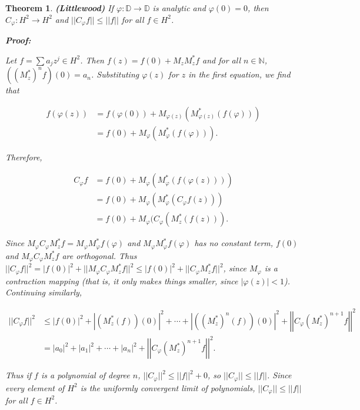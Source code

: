 \documentclass{article}
\theoremstyle{colontheorem}
\newtheorem{theorem}{Theorem}[section]
\newenvironment{Theorem}
{
	\begin{mdframed}[backgroundcolor=TheoremOrange!10]
	\begin{theorem}
}
{
	\end{theorem}
	\end{mdframed}
	
	\vspace{.15in}
}
\newenvironment{Proof}
{
	\begin{mdframed}[backgroundcolor=ProofPurple!10]
	\textbf{Proof:}%
}
{
	\end{mdframed}
	
	\vspace{.085in}
}
\begin{document}
\begin{Theorem}
	
	\textbf{(Littlewood)} If $\varphi : \mathbb{D} \longrightarrow \mathbb{D}$ is analytic and $\varphi(0) = 0$, then $C_\varphi : H^2 \longrightarrow H^2$ and $||C_\varphi f|| \leq ||f||$ for all $f \in H^2$.
	
	\begin{Proof}
		Let $f = \displaystyle\sum a_j z^j \in H^2$. Then $f(z) = f(0) + M_z M_z^* f$ and for all $n \in \mathbb{N}$, $\left( (M_z^*)^n f \right)(0) = a_n$. Substituting $\varphi(z)$ for $z$ in the first equation, we find that 
		
		\begin{align*}
			f(\varphi(z)) &= f(\varphi(0)) + M_{\varphi(z)} \left( M_{\varphi(z)}^* (f(\varphi)) \right)\\
			&= f(0) + M_\varphi \left( M_\varphi^* (f(\varphi)) \right).
		\end{align*}
		
		Therefore,
		
		\begin{align*}
			C_\varphi f &= f(0) + M_\varphi (M_\varphi^* (f(\varphi(z))))\\
			&= f(0) + M_\varphi (M_\varphi^* (C_\varphi f(z)))\\
			&= f(0) + M_\varphi (C_\varphi(M_z^* (f(z))).
		\end{align*}
		
		Since $M_\varphi C_\varphi M_z^* f = M_\varphi M_\varphi^* f(\varphi)$ and $M_\varphi M_\varphi^* f(\varphi)$ has no constant term, $f(0)$ and $M_\varphi C_\varphi M_z^* f$ are orthogonal. Thus $||C_\varphi f||^2 = |f(0)|^2 + ||M_\varphi C_\varphi M_z^* f||^2 \leq |f(0)|^2 + ||C_\varphi M_z^* f||^2$, since $M_\varphi$ is a contraction mapping (that is, it only makes things smaller, since $|\varphi(z)| < 1$). Continuing similarly,
		
		\begin{align*}
			||C_\varphi f||^2 &\leq |f(0)|^2 + |(M_z^* (f)) (0)|^2 + \cdots + \left| \left( (M_z^*)^n (f) \right) (0) \right|^2 + \left| \left| C_\varphi (M_z^*)^{n + 1} f \right| \right|^2\\
			&= |a_0|^2 + |a_1|^2 + \cdots + |a_n|^2 + \left| \left| C_\varphi (M_z^*)^{n + 1} f \right| \right|^2.
		\end{align*}
		
		Thus if $f$ is a polynomial of degree $n$, $||C_\varphi||^2 \leq ||f||^2 + 0$, so $||C_\varphi|| \leq ||f||$. Since every element of $H^2$ is the uniformly convergent limit of polynomials, $||C_\varphi|| \leq ||f||$ for all $f \in H^2$.
		
	\end{Proof}
	
\end{Theorem}
\end{document}

